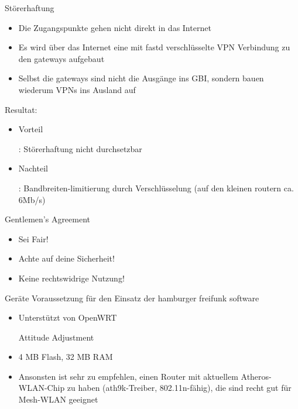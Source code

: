 \documentclass[c]{beamer}
\begin{document}
\begin{frame}{Störerhaftung}
	\begin{itemize}
		\item Die Zugangspunkte gehen nicht direkt in das Internet
		\item Es wird über das Internet eine mit fastd verschlüsselte VPN Verbindung zu den gateways aufgebaut
		\item Selbst die gateways sind nicht die Ausgänge ins GBI, sondern bauen wiederum VPNs ins Ausland auf
	\end{itemize}
	Resultat:
	\begin{itemize}
		\item \begin{it}Vorteil\end{it}: Störerhaftung nicht durchsetzbar
		\item \begin{it}Nachteil\end{it}: Bandbreiten-limitierung durch Verschlüsselung (auf den kleinen routern ca. 6Mb/s)
	\end{itemize}
\end{frame}


\begin{frame}{Gentlemen's Agreement}
	\begin{itemize}
		\item Sei Fair!
		\item Achte auf deine Sicherheit!
		\item Keine rechtswidrige Nutzung!
	\end{itemize}
\end{frame}


\begin{frame}{Geräte}
	Voraussetzung für den Einsatz der hamburger freifunk software
	\begin{itemize}
		\item Unterstützt von OpenWRT \begin{it}Attitude Adjustment\end{it}
		\item 4 MB Flash, 32 MB RAM
		\item Ansonsten ist sehr zu empfehlen, einen Router mit aktuellem Atheros-WLAN-Chip zu haben (ath9k-Treiber, 802.11n-fähig), die sind recht gut für Mesh-WLAN geeignet
	\end{itemize}
\end{frame}
\end{document}
